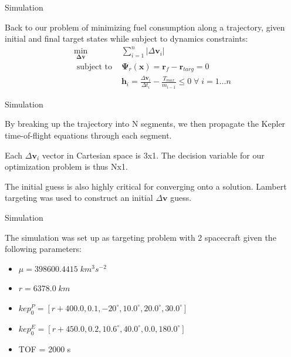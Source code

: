 

\begin{frame}{Simulation}

    Back to our problem of minimizing fuel consumption along a trajectory, given initial and final target states while subject to dynamics constraints: 
% 
    \begin{align}
        \min_{ \boldsymbol{ \Delta \boldsymbol{v} } }     & \sum_{i=1}^{n} | \Delta \boldsymbol{v}_i | \\ 
        \text{ subject to }         & \boldsymbol{\Psi}_r ( \boldsymbol{x} ) = \boldsymbol{r}_f - \boldsymbol{r}_{targ} = 0 \\  
        & \boldsymbol{h}_i = \frac{ \Delta \boldsymbol{v}_i }{ \Delta t_i } - \frac{ T_{max} }{ m_{i-1} } \leq 0 \; \forall \; i = 1 \hdots n 
    \end{align} 
    
\end{frame} 

\begin{frame}{Simulation } 

    By breaking up the trajectory into N segments, we then propagate the Kepler time-of-flight equations through each segment. 

    Each $ \Delta \mathbf{v}_i $ vector in Cartesian space is 3x1. The decision variable for our optimization problem is thus Nx1. 

    The initial guess is also highly critical for converging onto a solution. Lambert targeting was used to construct an initial $ \Delta \mathbf{v} $ guess. 
    
\end{frame}

\begin{frame}{Simulation}

    The simulation was set up as targeting problem with 2 spacecraft given the following parameters: 

    \begin{itemize} 
        \item $ \mu = 398600.4415 \; km^3 s^{-2} $ 
        \item $ r = 6378.0 \; km $ 
        \item $ kep_0^P = [ r+400.0, 0.1, -20^\circ, 10.0^\circ, 20.0^\circ, 30.0^\circ ] $ 
        \item $ kep_0^E = [ r+450.0, 0.2, 10.6^\circ, 40.0^\circ, 0.0, 180.0^\circ ] $ 
        \item TOF = 2000 s 
    \end{itemize} 
    
\end{frame} 

